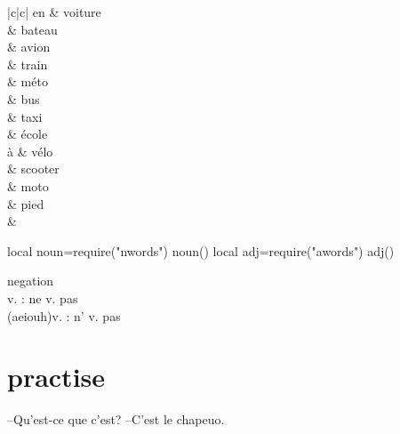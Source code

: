 \documentclass[./templates/main.tex]{subfiles}
\begin{document}
\begin{grammar}
  \begin{tblr}{|c|c|}
    \hline
        en & voiture \\
                           & bateau  \\
                           & avion   \\
                           & train   \\
                           & méto    \\
                           & bus     \\
                           & taxi    \\
                           & école   \\
    \hline
    à      & vélo    \\
                           & scooter \\
                           & moto    \\
                           & pied    \\
                           &
    \hline
  \end{tblr}
\end{grammar}
\begin{luacode*}
  local noun=require("nwords")
  noun()
  local adj=require("awords")
  adj()
\end{luacode*}
\begin{grammar}
  negation \\
  v. : ne v. pas \\
  (aeiouh)v. : n' v. pas
\end{grammar}

\section{practise}
--Qu'est-ce que c'est?
--C'est le chapeuo.
\end{document}
